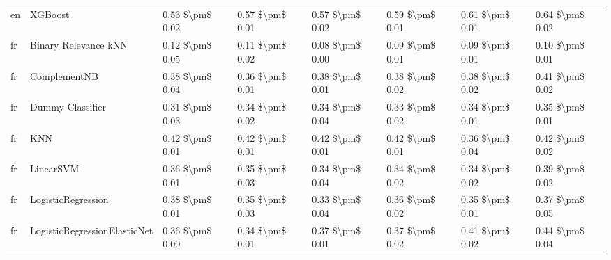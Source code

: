 \begin{tabular}{llllllll}
      en &                         XGBoost & 0.53 \$\textbackslash pm\$ 0.02 &           0.57 \$\textbackslash pm\$ 0.01 &       0.57 \$\textbackslash pm\$ 0.02 &        0.59 \$\textbackslash pm\$ 0.01 &                         0.61 \$\textbackslash pm\$ 0.01 &     0.64 \$\textbackslash pm\$ 0.02 \\
      fr &            Binary Relevance kNN & 0.12 \$\textbackslash pm\$ 0.05 &           0.11 \$\textbackslash pm\$ 0.02 &       0.08 \$\textbackslash pm\$ 0.00 &        0.09 \$\textbackslash pm\$ 0.01 &                         0.09 \$\textbackslash pm\$ 0.01 &     0.10 \$\textbackslash pm\$ 0.01 \\
      fr &                    ComplementNB & 0.38 \$\textbackslash pm\$ 0.04 &           0.36 \$\textbackslash pm\$ 0.01 &       0.38 \$\textbackslash pm\$ 0.01 &        0.38 \$\textbackslash pm\$ 0.02 &                         0.38 \$\textbackslash pm\$ 0.02 &     0.41 \$\textbackslash pm\$ 0.02 \\
      fr &                Dummy Classifier & 0.31 \$\textbackslash pm\$ 0.03 &           0.34 \$\textbackslash pm\$ 0.02 &       0.34 \$\textbackslash pm\$ 0.04 &        0.33 \$\textbackslash pm\$ 0.02 &                         0.34 \$\textbackslash pm\$ 0.01 &     0.35 \$\textbackslash pm\$ 0.01 \\
      fr &                             KNN & 0.42 \$\textbackslash pm\$ 0.01 &           0.42 \$\textbackslash pm\$ 0.01 &       0.42 \$\textbackslash pm\$ 0.01 &        0.42 \$\textbackslash pm\$ 0.01 &                         0.36 \$\textbackslash pm\$ 0.04 &     0.42 \$\textbackslash pm\$ 0.02 \\
      fr &                       LinearSVM & 0.36 \$\textbackslash pm\$ 0.01 &           0.35 \$\textbackslash pm\$ 0.03 &       0.34 \$\textbackslash pm\$ 0.04 &        0.34 \$\textbackslash pm\$ 0.02 &                         0.34 \$\textbackslash pm\$ 0.02 &     0.39 \$\textbackslash pm\$ 0.02 \\
      fr &              LogisticRegression & 0.38 \$\textbackslash pm\$ 0.01 &           0.35 \$\textbackslash pm\$ 0.03 &       0.33 \$\textbackslash pm\$ 0.04 &        0.36 \$\textbackslash pm\$ 0.02 &                         0.35 \$\textbackslash pm\$ 0.01 &     0.37 \$\textbackslash pm\$ 0.05 \\
      fr &    LogisticRegressionElasticNet & 0.36 \$\textbackslash pm\$ 0.00 &           0.34 \$\textbackslash pm\$ 0.01 &       0.37 \$\textbackslash pm\$ 0.01 &        0.37 \$\textbackslash pm\$ 0.02 &                         0.41 \$\textbackslash pm\$ 0.02 &     0.44 \$\textbackslash pm\$ 0.04 \\

\end{tabular}
